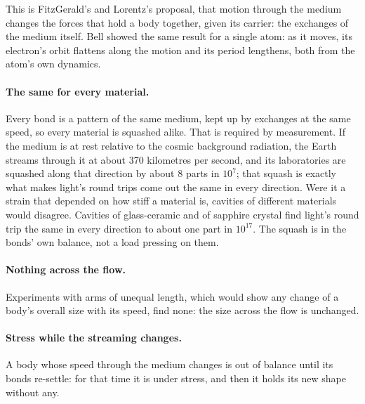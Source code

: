 \documentclass[11pt,a4paper]{article}
\begin{document}
This is FitzGerald's and Lorentz's proposal, that motion through the medium changes the forces that hold a body together, given its carrier: the exchanges of the medium itself. Bell showed the same result for a single atom: as it moves, its electron's orbit flattens along the motion and its period lengthens, both from the atom's own dynamics.

\paragraph{The same for every material.} Every bond is a pattern of the same medium, kept up by exchanges at the same speed, so every material is squashed alike. That is required by measurement. If the medium is at rest relative to the cosmic background radiation, the Earth streams through it at about 370 kilometres per second, and its laboratories are squashed along that direction by about 8 parts in $10^7$; that squash is exactly what makes light's round trips come out the same in every direction. Were it a strain that depended on how stiff a material is, cavities of different materials would disagree. Cavities of glass-ceramic and of sapphire crystal find light's round trip the same in every direction to about one part in $10^{17}$. The squash is in the bonds' own balance, not a load pressing on them.

\paragraph{Nothing across the flow.} Experiments with arms of unequal length, which would show any change of a body's overall size with its speed, find none: the size across the flow is unchanged. 

\paragraph{Stress while the streaming changes.} A body whose speed through the medium changes is out of balance until its bonds re-settle: for that time it is under stress, and then it holds its new shape without any. 
\end{document}
